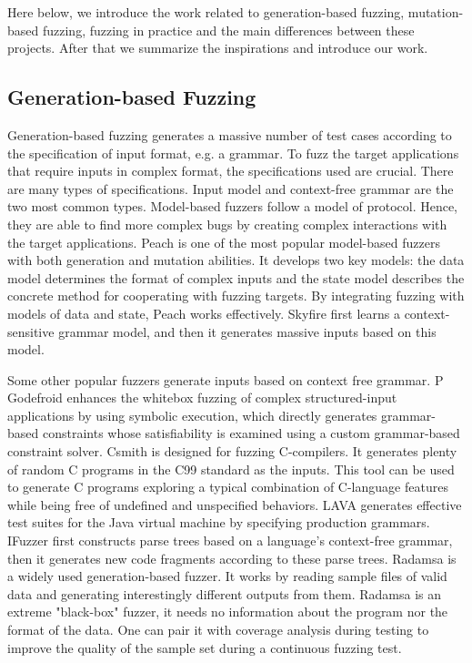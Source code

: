Here below, we introduce the work related to generation-based fuzzing, mutation-based fuzzing, fuzzing in practice and the main differences between these projects. After that we summarize the inspirations and introduce our work.

\subsection{Generation-based Fuzzing}
Generation-based fuzzing generates a massive number of test cases according to  the specification of input format, e.g. a grammar. To fuzz the target applications that require inputs in complex format, the specifications used are crucial.
There are many types of specifications. Input model and context-free grammar are the two most common types.
Model-based fuzzers \cite{peach,skyfire,spike} follow a model of protocol. Hence, they are able to find more complex bugs by creating complex interactions with the target applications.
Peach \cite{peach} is one of the most popular model-based fuzzers with both generation and mutation abilities.
It develops two key models:
the data model determines the format of complex inputs and the state model describes the concrete method for cooperating with fuzzing targets.
By integrating fuzzing with models of data and state, Peach works effectively. 
Skyfire \cite{skyfire} first learns a context-sensitive grammar model, and then it generates massive inputs based on this model.

Some other popular fuzzers \cite{godefroid2008grammar,csmith,lava,ifuzzer,holler2012fuzzing} generate inputs based on context free grammar. 
P Godefroid \cite{godefroid2008grammar} enhances the whitebox fuzzing of complex structured-input applications by using symbolic execution, which directly generates grammar-based constraints whose satisfiability is examined using a custom grammar-based constraint solver.
Csmith \cite{csmith} is designed for fuzzing C-compilers. It generates plenty of random C programs in the C99 standard as the inputs. 
This tool can be used to generate C programs exploring a typical combination of C-language features while being free of undefined and unspecified behaviors. 
LAVA \cite{lava} generates effective test suites for the Java virtual machine by specifying production grammars.
IFuzzer \cite{ifuzzer} first constructs parse trees based on a language's context-free grammar, then it generates new code fragments according to these parse trees.
Radamsa \cite{helin2016radamsa} is a widely used generation-based fuzzer. It works by reading sample files of valid data and generating interestingly different outputs from them. Radamsa is an extreme "black-box" fuzzer, it needs no information about the program nor the format of the data. One can pair it with coverage analysis during testing to improve the quality of the sample set during a continuous fuzzing test.

